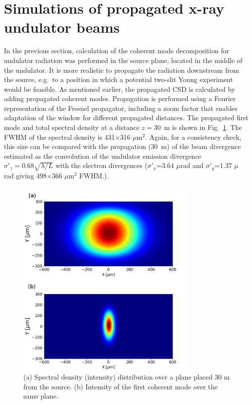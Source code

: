 \documentclass[%
 reprint,
 amsmath,amssymb,
 aps,
]{revtex4-1}
\begin{document}
\section{Simulations of propagated x-ray undulator beams}

In the previous section, calculation of the coherent mode decomposition for undulator radiation was performed in the source plane, located in the middle of the undulator. It is more realistic to propagate the radiation downstream from the source, e.g.~to a position in which a potential two-slit Young experiment would be feasible. As mentioned earlier, the propagated CSD is calculated by adding  propagated coherent modes. Propagation is performed using a Fourier representation of the Fresnel propagator, including a zoom factor \cite{schmidt,pirro} that enables adaptation of the window for different propagated distances. The propagated first mode and total spectral density at a distance $z=30$~m is shown in Fig.~\ref{spectral_density_propagated}. The FWHM of the spectral density is 431$\times$316 $\mu$m$^2$. Again, for a consistency check, this size can be compared with the propagation (30~m) of the beam divergence estimated as the convolution of the undulator emission divergence $\sigma'_\gamma=0.68\sqrt{\lambda/L}$ with the electron divergences ($\sigma'_x$=3.64 $\mu$rad and $\sigma'_y$=1.37 $\mu$ rad giving 498$\times$366 $\mu$m$^2$ FWHM.). 

\begin{figure}
\includegraphics[width=9.0cm]{Figures/spectral_density_propagated.png}
\caption{(a) Spectral density (intensity) distribution over a plane placed 30 m from the source. (b) Intensity of the first coherent mode over the same plane.}
\label{spectral_density_propagated}%
\end{figure}
\end{document}
